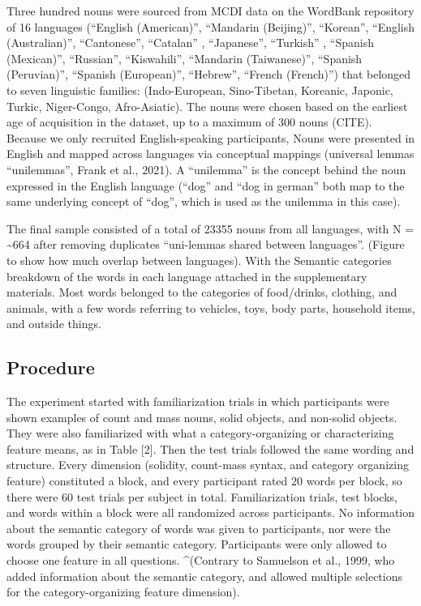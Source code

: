 \documentclass[
  english,
  man]{apa6}
\begin{document}
Three hundred nouns were sourced from MCDI data on the WordBank repository of 16 languages (``English (American)'', ``Mandarin (Beijing)'', ``Korean'', ``English (Australian)'', ``Cantonese'', ``Catalan'' , ``Japanese'', ``Turkish'' , ``Spanish (Mexican)'', ``Russian'', ``Kiswahili'', ``Mandarin (Taiwanese)'', ``Spanish (Peruvian)'', ``Spanish (European)'', ``Hebrew'', ``French (French)'') that belonged to seven linguistic families: (Indo-European, Sino-Tibetan, Koreanic, Japonic, Turkic, Niger-Congo, Afro-Asiatic).
The nouns were chosen based on the earliest age of acquisition in the dataset, up to a maximum of 300 nouns (CITE). Because we only recruited English-speaking participants, Nouns were presented in English and mapped across languages via conceptual mappings (universal lemmas ``unilemmas'', Frank et al., 2021). A ``unilemma'' is the concept behind the noun expressed in the English language (``dog'' and ``dog in german'' both map to the same underlying concept of ``dog'', which is used as the unilemma in this case).

The final sample consisted of a total of 23355 nouns from all languages, with N = \textasciitilde664 after removing duplicates ``uni-lemmas shared between languages''. (Figure to show how much overlap between languages). With the Semantic categories breakdown of the words in each language attached in the supplementary materials. Most words belonged to the categories of food/drinks, clothing, and animals, with a few words referring to vehicles, toys, body parts, household items, and outside things.

\subsection{Procedure}\label{procedure}

The experiment started with familiarization trials in which participants were shown examples of count and mass nouns, solid objects, and non-solid objects. They were also familiarized with what a category-organizing or characterizing feature means, as in Table {[}2{]}. Then the test trials followed the same wording and structure. Every dimension (solidity, count-mass syntax, and category organizing feature) constituted a block, and every participant rated 20 words per block, so there were 60 test trials per subject in total. Familiarization trials, test blocks, and words within a block were all randomized across participants. No information about the semantic category of words was given to participants, nor were the words grouped by their semantic category. Participants were only allowed to choose one feature in all questions.
\^{}(Contrary to Samuelson et al., 1999, who added information about the semantic category, and allowed multiple selections for the category-organizing feature dimension).
\end{document}
